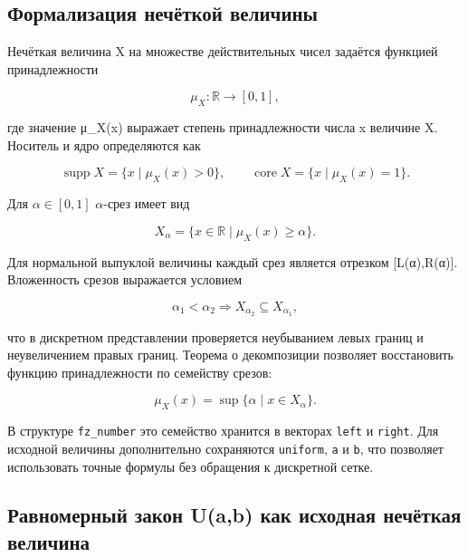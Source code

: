 \subsection{Формализация нечёткой величины}

Нечёткая величина X на множестве действительных чисел задаётся функцией принадлежности

\begin{equation}
\mu_X: \mathbb{R}\rightarrow[0,1],
\end{equation}

где значение μ\_X(x) выражает степень принадлежности числа x величине X. Носитель и ядро определяются как

\begin{equation}
\operatorname{supp}X=\{x\mid \mu_X(x)>0\},\qquad \operatorname{core}X=\{x\mid \mu_X(x)=1\}.
\end{equation}

Для $\alpha\in[0,1]$ $\alpha$-срез имеет вид

\begin{equation}
X_\alpha=\{x\in\mathbb{R}\mid \mu_X(x)\geq\alpha\}.
\end{equation}

Для нормальной выпуклой величины каждый срез является отрезком [L(α),R(α)]. Вложенность срезов выражается условием

\begin{equation}
\alpha_1<\alpha_2 \Rightarrow X_{\alpha_2}\subseteq X_{\alpha_1},
\end{equation}

что в дискретном представлении проверяется неубыванием левых границ и неувеличением правых границ. Теорема о декомпозиции позволяет восстановить функцию принадлежности по семейству срезов:

\begin{equation}
\mu_X(x)=\sup\{\alpha\mid x\in X_\alpha\}.
\end{equation}

В структуре \texttt{fz\_number} это семейство хранится в векторах \texttt{left} и \texttt{right}. Для исходной величины дополнительно сохраняются \texttt{uniform}, \texttt{a} и \texttt{b}, что позволяет использовать точные формулы без обращения к дискретной сетке.

\subsection{Равномерный закон U(a,b) как исходная нечёткая величина}

